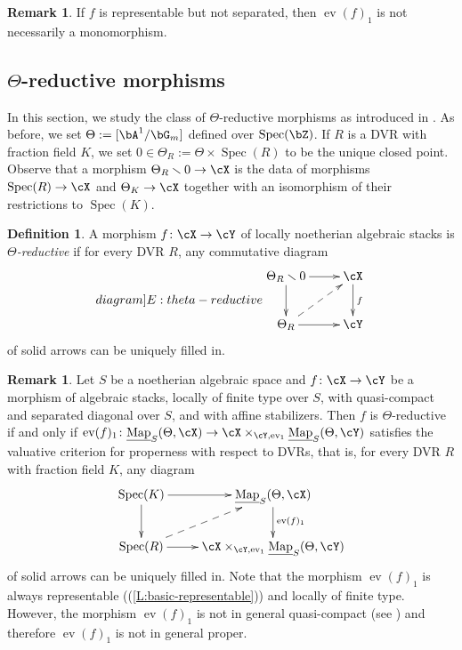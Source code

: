 \documentclass[a4paper]{amsart}
\numberwithin{equation}{section}
\theoremstyle{plain}
\theoremstyle{definition}
\newtheorem{rem}[thm]{Remark}
\newtheorem{remark}[thm]{Remark}
\newtheorem{defn}[thm]{Definition}
\DeclareMathOperator{\Spec}{Spec}
\DeclareMathOperator{\ev}{ev}
\newcommand{\uMap}{\underline{{\rm Map}}}
\newcommand{\co}{\colon}
\begin{document}
\begin{rem} \label{R:basic-not-monomorphism}
If $f$ is representable but not separated, then $\ev(f)_1$ is not necessarily a monomorphism.  
\end{rem}





\subsection{\texorpdfstring{$\Theta$}{Theta}-reductive morphisms} \label{S:theta-reductive}
In this section, we study the class of $\Theta$-reductive morphisms as introduced in \cite{hlinstability}. As before, we set $\Theta := [\bA^1/ \bG_m]$  defined over $\Spec(\bZ)$. 
If $R$ is a DVR with fraction field $K$, we  set $0 \in \Theta_R := \Theta \times \Spec(R)$ to be the unique closed point.  Observe that a morphism $\Theta_R \smallsetminus 0 \to \cX$ is the data of morphisms $\Spec(R) \to \cX$ and $\Theta_K \to \cX$ together with an isomorphism of their restrictions to $\Spec(K)$.

\begin{defn} \label{D:theta-reductive}
A morphism $f \co \cX \to \cY$ of locally noetherian algebraic stacks is \emph{$\Theta$-reductive} if for every DVR $R$, 
any commutative diagram
\begin{equation}
\label[diagram]{E:theta-reductive}
\begin{split}
\xymatrix{
\Theta_R \smallsetminus 0 \ar[r] \ar[d]		& \cX  \ar[d]^f \\
\Theta_R \ar[r]	\ar@{-->}[ur]			& \cY
}
\end{split}
\end{equation}
of solid arrows can be uniquely filled in.
\end{defn}

\begin{remark} \label{R:theta-reductive-equiv}
Let $S$ be a noetherian algebraic space and $f \co \cX \to \cY$ be a morphism of algebraic stacks, locally of finite type over $S$, with quasi-compact and separated diagonal over $S$, and with affine stabilizers.
Then $f$ is $\Theta$-reductive if and only if $\ev(f)_1 \co \uMap_S(\Theta,\cX)  \to \cX \times_{\cY, \ev_1} \uMap_S(\Theta,\cY)$ satisfies the valuative criterion for properness with respect to DVRs, that is,  
for every DVR $R$ with fraction field $K$, any diagram
$$\xymatrix{
\Spec(K) \ar[r] \ar[d]					& \uMap_S(\Theta,\cX)  \ar[d]^{\ev(f)_1} \\
 \Spec(R) 	 \ar@{-->}[ur] \ar[r]				& \cX \times_{\cY, \ev_1} \uMap_S(\Theta,\cY)
}$$
of solid arrows can be uniquely filled in.  Note that the morphism $\ev(f)_1$ is always representable ((\ref{L:basic-representable})) and locally of finite type. However, the morphism $\ev(f)_1$ is not in general quasi-compact (see ) and therefore $\ev(f)_1$ is not in general proper.
\end{remark}
\end{document}
